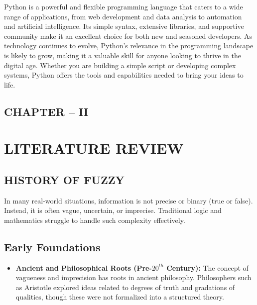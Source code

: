 \documentclass[12pt,a4paper]{article}
\begin{document}
Python is a powerful and flexible programming language that caters to a wide range of applications, from web development and data analysis to automation and artificial intelligence. Its simple syntax, extensive libraries, and supportive community make it an excellent choice for both new and seasoned developers. As technology continues to evolve, Python's relevance in the programming landscape is likely to grow, making it a valuable skill for anyone looking to thrive in the digital age. Whether you are building a simple script or developing complex systems, Python offers the tools and capabilities needed to bring your ideas to life.

\newpage
\begin{center}
    \section*{CHAPTER – II}
\end{center}


\section{LITERATURE REVIEW}

\subsection{HISTORY OF FUZZY}
\hspace{1em}In many real-world situations, information is not precise or binary (true or false). Instead, it is often vague, uncertain, or imprecise. Traditional logic and mathematics struggle to handle such complexity effectively.


\subsection*{Early Foundations}
\begin{itemize}

\item \textbf{Ancient and Philosophical Roots (Pre-$20^{th}$ Century):} The concept of vagueness and imprecision has roots in ancient philosophy. Philosophers such as Aristotle explored ideas related to degrees of truth and gradations of qualities, though these were not formalized into a structured theory.
\end{itemize}
\end{document}
